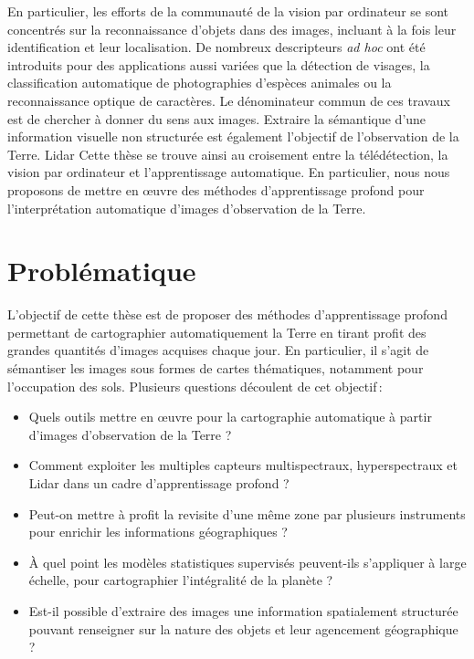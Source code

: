 En particulier, les efforts de la communauté de la vision par ordinateur se sont concentrés sur la reconnaissance d'objets dans des images, incluant à la fois leur identification et leur localisation. De nombreux descripteurs \emph{ad hoc} ont été introduits pour des applications aussi variées que la détection de visages, la classification automatique de photographies d'espèces animales ou la reconnaissance optique de caractères. Le dénominateur commun de ces travaux est de chercher à donner du sens aux images. Extraire la sémantique d'une information visuelle non structurée est également l'objectif de l'observation de la Terre.
Lidar
Cette thèse se trouve ainsi au croisement entre la télédétection, la vision par ordinateur et l'apprentissage automatique. En particulier, nous nous proposons de mettre en \oe{}uvre des méthodes d'apprentissage profond pour l'interprétation automatique d'images d'observation de la Terre.

\section{Problématique}

L'objectif de cette thèse est de proposer des méthodes d'apprentissage profond permettant de cartographier automatiquement la Terre en tirant profit des grandes quantités d'images acquises chaque jour. En particulier, il s'agit de sémantiser les images sous formes de cartes thématiques, notamment pour l'occupation des sols. Plusieurs questions découlent de cet objectif\,:
\begin{itemize}
	\item Quels outils mettre en \oe{}uvre pour la cartographie automatique à partir d'images d'observation de la Terre ?
	\item Comment exploiter les multiples capteurs multispectraux, hyperspectraux et Lidar dans un cadre d'apprentissage profond ?
	\item Peut-on mettre à profit la revisite d'une même zone par plusieurs instruments pour enrichir les informations géographiques ?
	\item À quel point les modèles statistiques supervisés peuvent-ils s'appliquer à large échelle, pour cartographier l'intégralité de la planète ?
	\item Est-il possible d'extraire des images une information spatialement structurée pouvant renseigner sur la nature des objets et leur agencement géographique ?
\end{itemize}

